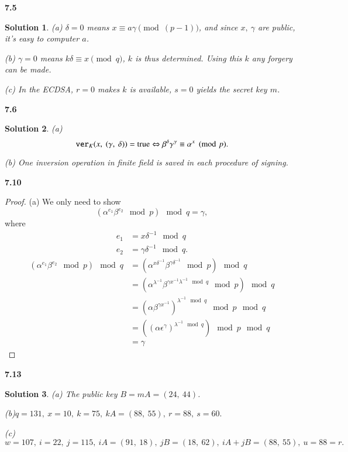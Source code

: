 \documentclass[12pt,a4paper]{article}
\theoremstyle{solution}
\newtheorem*{sol}{Solution}
\begin{document}
\textbf{7.5}

\begin{sol}
(a) $\delta=0$ means $x\equiv a\gamma \pmod{(p-1)}$, and since $x,~\gamma$ are public, it's easy to computer $a$.

(b) $\gamma=0$ means $k\delta \equiv x\pmod{q}$, $k$ is thus determined. Using this $k$ any forgery can be made.

(c) In the ECDSA, $r=0$ makes  $k$ is available, $s=0$ yields the secret key $m$.
\end{sol}


\textbf{7.6}

\begin{sol}
(a)
$$\verb|ver|_K (x,~(\gamma,~\delta))=\text{true} \Leftrightarrow \beta^\delta \gamma^\gamma \equiv \alpha^x \pmod{p}.$$

(b) One inversion operation in finite field is saved in each procedure of signing.

\end{sol}

\textbf{7.10}

\begin{proof}
(a) We only need to show
$$(\alpha ^{e_1} \beta ^{e_2} \mod p) \mod q =\gamma,$$
where
\begin{align*}
e_1& =x \delta^{-1} \mod q \\
e_2& =\gamma \delta ^{-1} \mod q.
\end{align*}
\begin{align*}
(\alpha ^{e_1} \beta ^{e_2} \mod p) \mod q & =(\alpha ^{x \delta^{-1}} \beta ^{\gamma \delta^{-1}} \mod p) \mod q\\
   & =(\alpha ^{\lambda^{-1}} \beta ^{\gamma x^{-1}\lambda^{-1}\mod q} \mod p) \mod q\\
     & =(\alpha \beta^{\gamma x^{-1}})^{\lambda^{-1}\mod q}\mod p \mod q\\
     & =((\alpha \epsilon^{\gamma})^{\lambda^{-1} \mod q})\mod p \mod q\\
     & =\gamma
\end{align*}
\end{proof}

\textbf{7.13}

\begin{sol}
(a) The public key $B=mA=(24,~44)$.

(b)$q=131,~x=10,~k=75,~kA=(88,~55),~r=88,~s=60.$

(c)$w=107,~i=22,~j=115,~iA=(91,~18),~jB=(18,~62),~iA+jB=(88,~55),~u=88=r.$

\end{sol}
\end{document}
